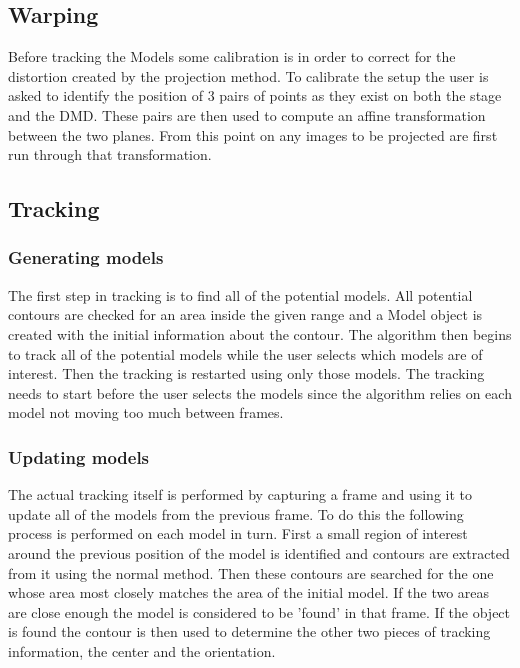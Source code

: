 \documentclass[11pt]{article}
\begin{document}
\subsection{Warping}
\label{sec-1-3}

Before tracking the Models some calibration is in order to correct
for the distortion created by the projection method. To calibrate
the setup the user is asked to identify the position of 3 pairs of points as
they exist on both the stage and the DMD. These pairs are then used
to compute an affine transformation between the two planes. From
this point on any images to be projected are first run through that
transformation.

\subsection{Tracking}
\label{sec-1-4}

\subsubsection{Generating models}
\label{sec-1-4-1}

The first step in tracking is to find all of the potential
models. All potential contours are checked for an area inside
the given range and a Model object is created with the initial
information about the contour. The algorithm then begins to track
all of the potential models while the user selects which models
are of interest. Then the tracking is restarted using only those
models. The tracking needs to start before the user selects the
models since the algorithm relies on each model not moving too
much between frames.

\subsubsection{Updating models}
\label{sec-1-4-2}

The actual tracking itself is performed by capturing a frame and
using it to update all of the models from the previous frame. To
do this the following process is performed on each model in
turn. First a small region of interest around the previous
position of the model is identified and contours are extracted
from it using the normal method. Then these contours are searched
for the one whose area most closely matches the area of the
initial model. If the two areas are close enough the model is
considered to be 'found' in that frame. If the object is found the
contour is then used to determine the other two pieces of tracking
information, the center and the orientation. 
\end{document}
